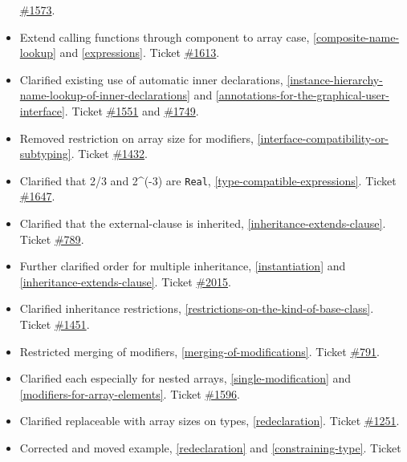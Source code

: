 \begin{itemize}
  \href{https://github.com/modelica/ModelicaSpecification/issues/1573}{\#1573}.
\item
  Extend calling functions through component to array case, \cref{composite-name-lookup} and \cref{expressions}. Ticket
  \href{https://github.com/modelica/ModelicaSpecification/issues/1613}{\#1613}.
\item
  Clarified existing use of automatic inner declarations, \cref{instance-hierarchy-name-lookup-of-inner-declarations}
  and \cref{annotations-for-the-graphical-user-interface}. Ticket
  \href{https://github.com/modelica/ModelicaSpecification/issues/1551}{\#1551} and
  \href{https://github.com/modelica/ModelicaSpecification/issues/1749}{\#1749}.
\item
  Removed restriction on array size for modifiers, \cref{interface-compatibility-or-subtyping}. Ticket
  \href{https://github.com/modelica/ModelicaSpecification/issues/1432}{\#1432}.
\item
  Clarified that 2/3 and 2\^{}(-3) are \lstinline!Real!, \cref{type-compatible-expressions}.
  Ticket \href{https://github.com/modelica/ModelicaSpecification/issues/1647}{\#1647}.
\item
  Clarified that the external-clause is inherited, \cref{inheritance-extends-clause}.
  Ticket \href{https://github.com/modelica/ModelicaSpecification/issues/789}{\#789}.
\item
  Further clarified order for multiple inheritance, \cref{instantiation} and
  \cref{inheritance-extends-clause}. Ticket
  \href{https://github.com/modelica/ModelicaSpecification/issues/2015}{\#2015}.
\item
  Clarified inheritance restrictions, \cref{restrictions-on-the-kind-of-base-class}. Ticket
  \href{https://github.com/modelica/ModelicaSpecification/issues/1451}{\#1451}.
\item
  Restricted merging of modifiers, \cref{merging-of-modifications}. Ticket
  \href{https://github.com/modelica/ModelicaSpecification/issues/791}{\#791}.
\item
  Clarified each especially for nested arrays, \cref{single-modification} and \cref{modifiers-for-array-elements}.
  Ticket \href{https://github.com/modelica/ModelicaSpecification/issues/1596}{\#1596}.
\item
  Clarified replaceable with array sizes on types, \cref{redeclaration}. Ticket
  \href{https://github.com/modelica/ModelicaSpecification/issues/1251}{\#1251}.
\item
  Corrected and moved example, \cref{redeclaration} and \cref{constraining-type}. Ticket

\end{itemize}
